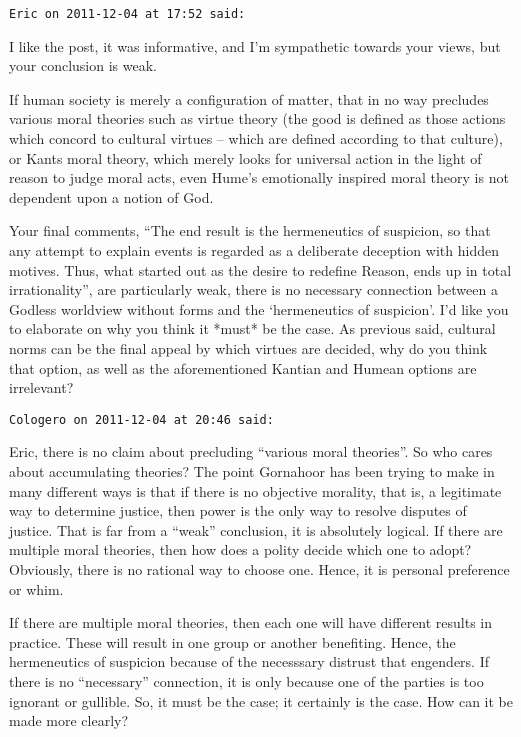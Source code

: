 \begin{footnotesize}
\begin{sffamily}
\hfill

\texttt{Eric on 2011-12-04 at 17:52 said: }

I like the post, it was informative, and I'm sympathetic towards your views, but your conclusion is weak.

If human society is merely a configuration of matter, that in no way precludes various moral theories such as virtue theory (the good is defined as those actions which concord to cultural virtues – which are defined according to that culture), or Kants moral theory, which merely looks for universal action in the light of reason to judge moral acts, even Hume's emotionally inspired moral theory is not dependent upon a notion of God.

Your final comments, “The end result is the hermeneutics of suspicion, so that any attempt to explain events is regarded as a deliberate deception with hidden motives. Thus, what started out as the desire to redefine Reason, ends up in total irrationality”, are particularly weak, there is no necessary connection between a Godless worldview without forms and the `hermeneutics of suspicion'. I'd like you to elaborate on why you think it *must* be the case. As previous said, cultural norms can be the final appeal by which virtues are decided, why do you think that option, as well as the aforementioned Kantian and Humean options are irrelevant?


\hfill

\texttt{Cologero on 2011-12-04 at 20:46 said: }

Eric, there is no claim about precluding “various moral theories”. So who cares about accumulating theories? The point Gornahoor has been trying to make in many different ways is that if there is no objective morality, that is, a legitimate way to determine justice, then power is the only way to resolve disputes of justice. That is far from a “weak” conclusion, it is absolutely logical. If there are multiple moral theories, then how does a polity decide which one to adopt? Obviously, there is no rational way to choose one. Hence, it is personal preference or whim.

If there are multiple moral theories, then each one will have different results in practice. These will result in one group or another benefiting. Hence, the hermeneutics of suspicion because of the necesssary distrust that engenders. If there is no “necessary” connection, it is only because one of the parties is too ignorant or gullible. So, it must be the case; it certainly is the case. How can it be made more clearly?


\end{sffamily}
\end{footnotesize}
